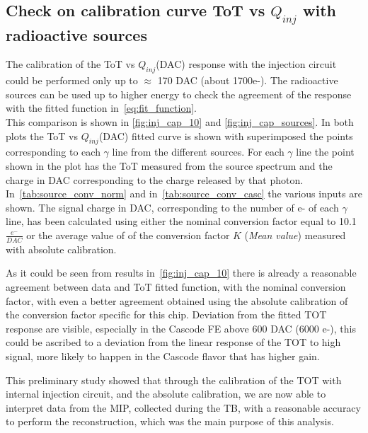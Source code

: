 \subsection{Check on calibration curve ToT vs $Q_{inj}$ with radioactive sources}

The calibration of the ToT vs $Q_{inj}$(DAC) response with the injection circuit could be performed only up to $\approx$ 170 DAC (about 1700e-). The radioactive sources can be used up to higher energy to check the agreement of the response with the fitted function in~\autoref{eq:fit_function}.\\

This comparison is shown in \autoref{fig:inj_cap_10} and \autoref{fig:inj_cap_sources}. In both plots the ToT vs $Q_{inj}$(DAC) fitted curve is shown with superimposed the points corresponding to each $\gamma$ line from the different sources. 
For each $\gamma$ line the point shown in the plot has the ToT measured from the source spectrum and the charge in DAC corresponding to the charge released by that photon.  
In~\autoref{tab:source_conv_norm} and in~\autoref{tab:source_conv_casc} the various inputs are shown. 
The signal charge in DAC, corresponding to the number of e- of each $\gamma$ line, has been calculated using either the nominal conversion factor equal to 10.1 $\frac{e^{-}}{DAC}$ or the average value of of the conversion factor $K$ (\textit{Mean value}) measured with  absolute calibration. 

As it could be seen from results in~\autoref{fig:inj_cap_10} there is already a reasonable agreement between data and ToT fitted function, with the nominal conversion factor, with even a better agreement obtained using the absolute calibration of the conversion factor specific for this chip. 
Deviation from the fitted TOT response are visible, especially in the Cascode FE above 600 DAC (6000 e-), this could be ascribed to a deviation from the linear response of the TOT to high signal, more likely to happen in the Cascode flavor that has higher gain.

This preliminary study showed that through the calibration of the TOT with internal injection circuit, and the absolute calibration, we are now able to interpret data from the MIP, collected during the TB,  with a reasonable accuracy to perform the reconstruction, which was the main purpose of this analysis.



